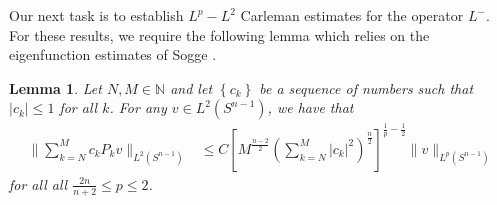 \documentclass[11pt]{amsart}
\theoremstyle{plain}
\newtheorem{lemma}{Lemma}
\numberwithin{equation}{section}
\begin{document}
Our next task is to establish $L^p - L^2$ Carleman estimates for the operator $L^-$.
For these results, we require the following lemma which relies on the eigenfunction estimates of Sogge \cite{Sog86}.

\begin{lemma}
Let $N, M \in {\ensuremath{\mathbb{N}}}$ and let ${\left\{{c_k}\right\}}$ be a sequence of numbers such that ${\left\vert{c_k}\right\vert} \le 1$ for all $k$.
For any $v \in L^2{\left( {S^{n-1}} \right) }$, we have that
\begin{align}
\|\sum^M_{k=N} c_k P_k v\|_{L^2(S^{n-1})} &\leq C
{\left[{M^{\frac{n-2}{2}} {\left( { \sum^M_{k=N}
|c_k|^2} \right) }^{\frac{n}{2}}}\right]}^{\frac{1}{p}-\frac{1}{2}}\|
v\|_{L^p(S^{n-1})} \label{haha}
\end{align}
for all all $\frac{2n}{n+2}\leq p\leq 2$. \label{upDown}
\end{lemma}
\end{document}
